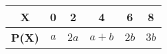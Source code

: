 \begin{tabular}[12pt]{ |c| c| c| c| c| c|}
    \hline
    \textbf{X} & 0 & 2 & 4 & 6 & 8 \\ 
    \hline
    \textbf{P(X)} & $a$ & $2a$ & $a+b$ & $2b$ & $3b$ \\
    \hline   
    \end{tabular}
